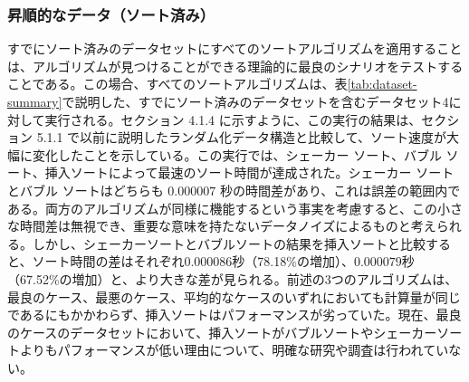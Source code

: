 \documentclass[a4j, 11pt]{jarticle}
\begin{document}
\subsubsection{昇順的なデータ（ソート済み）}
すでにソート済みのデータセットにすべてのソートアルゴリズムを適用することは、アルゴリズムが見つけることができる理論的に最良のシナリオをテストすることである。この場合、すべてのソートアルゴリズムは、表\ref{tab:dataset-summary}で説明した、すでにソート済みのデータセットを含むデータセット4に対して実行される。セクション 4.1.4 に示すように、この実行の結果は、セクション 5.1.1 で以前に説明したランダム化データ構造と比較して、ソート速度が大幅に変化したことを示している。この実行では、シェーカー ソート、バブル ソート、挿入ソートによって最速のソート時間が達成された。シェーカー ソートとバブル ソートはどちらも $0.000007$ 秒の時間差があり、これは誤差の範囲内である。両方のアルゴリズムが同様に機能するという事実を考慮すると、この小さな時間差は無視でき、重要な意味を持たないデータノイズによるものと考えられる。しかし、シェーカーソートとバブルソートの結果を挿入ソートと比較すると、ソート時間の差はそれぞれ$0.000086$秒（78.18\%の増加）、$0.000079$秒（67.52\%の増加）と、より大きな差が見られる。前述の3つのアルゴリズムは、最良のケース、最悪のケース、平均的なケースのいずれにおいても計算量が同じであるにもかかわらず、挿入ソートはパフォーマンスが劣っていた。現在、最良のケースのデータセットにおいて、挿入ソートがバブルソートやシェーカーソートよりもパフォーマンスが低い理由について、明確な研究や調査は行われていない。\
\end{document}
